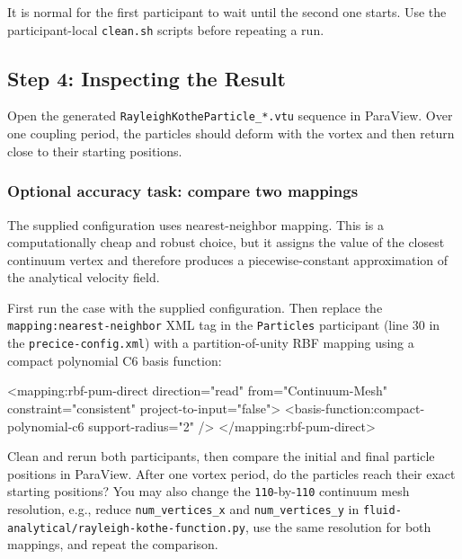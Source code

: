 It is normal for the first participant to wait until the second one
starts. Use the participant-local \nolinkurl{clean.sh} scripts before
repeating a run.

\subsection{Step 4: Inspecting the
Result}\label{01-rayleigh-kothe__readmemd__step-4-inspecting-the-result}

Open the generated \nolinkurl{RayleighKotheParticle_*.vtu} sequence in
ParaView. Over one coupling period, the particles should deform with the
vortex and then return close to their starting positions.

\subsubsection{Optional accuracy task: compare two
mappings}\label{01-rayleigh-kothe__readmemd__optional-accuracy-task-compare-two-mappings}

The supplied configuration uses nearest-neighbor mapping. This is a
computationally cheap and robust choice, but it assigns the value of the
closest continuum vertex and therefore produces a piecewise-constant
approximation of the analytical velocity field.

First run the case with the supplied configuration. Then replace the
\nolinkurl{mapping:nearest-neighbor} XML tag in the
\nolinkurl{Particles} participant (line 30 in the
\nolinkurl{precice-config.xml}) with a partition-of-unity RBF mapping
using a compact polynomial C6 basis function:

\noindent\begin{minipage}{\linewidth}
\begin{CourseCode}
<mapping:rbf-pum-direct
  direction="read"
  from="Continuum-Mesh"
  constraint="consistent"
  project-to-input="false">
  <basis-function:compact-polynomial-c6 support-radius="2" />
</mapping:rbf-pum-direct>
\end{CourseCode}
\end{minipage}

Clean and rerun both participants, then compare the initial and final
particle positions in ParaView. After one vortex period, do the
particles reach their exact starting positions? You may also change the
\nolinkurl{110}-by-\nolinkurl{110} continuum mesh resolution, e.g.,
reduce \nolinkurl{num_vertices_x} and \nolinkurl{num_vertices_y} in
\nolinkurl{fluid-analytical/rayleigh-kothe-function.py}, use the same
resolution for both mappings, and repeat the comparison.

